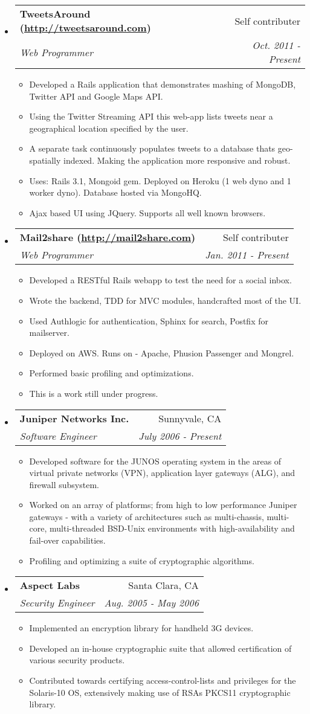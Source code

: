 \documentclass[letterpaper,11pt]{article}
\makeatletter
\newcommand{\resitem}[1]{\item #1 \vspace{-2pt}}
\newcommand{\resheading}[1]{{\large \parashade[.9]{sharpcorners}{\textbf{#1 \vphantom{p\^{E}}}}}}
\newcommand{\ressubheading}[4]{
\begin{tabular*}{6.5in}{l@{\extracolsep{\fill}}r}
		\textbf{#1} & #2 \\
		\textit{#3} & \textit{#4} \\
\end{tabular*}\vspace{-6pt}}
\makeatother
\begin{document}
\resheading{Work Experience}
\begin{itemize}

\item
	\ressubheading{TweetsAround (\url{http://tweetsaround.com})}{Self contributer}{Web Programmer}{Oct. 2011 - Present}
	\begin{itemize}
		\resitem{Developed a Rails application that demonstrates mashing of MongoDB, Twitter API and Google Maps API.}
		\resitem{Using the Twitter Streaming API this web-app lists tweets near a geographical location specified by the user.}
		\resitem{A separate task continuously populates tweets to a database thats geo-spatially indexed. 
		 		 Making the application more responsive and robust.}
		\resitem{Uses: Rails 3.1, Mongoid gem.  Deployed on Heroku (1 web dyno and 1 worker dyno). Database hosted via MongoHQ.}
		\resitem{Ajax based UI using JQuery. Supports all well known browsers.}
	\end{itemize}

\item
	\ressubheading{Mail2share (\url{http://mail2share.com})}{Self contributer}{Web Programmer}{Jan. 2011 - Present}
	\begin{itemize}
		\resitem{Developed a RESTful Rails webapp to test the need for a social inbox.}
		\resitem{Wrote the backend, TDD for MVC modules, handcrafted most of the UI.}
		\resitem{Used Authlogic for authentication, Sphinx for search, Postfix for mailserver.}
		\resitem{Deployed on AWS. Runs on - Apache, Phusion Passenger and Mongrel.}
		\resitem{Performed basic profiling and optimizations.}
		\resitem{This is a work still under progress.}
	\end{itemize}
		
\item
	\ressubheading{Juniper Networks Inc.}{Sunnyvale, CA}{Software Engineer}{July 2006 - Present}
	\begin{itemize}
		\resitem{Developed software for the JUNOS operating system in the areas of virtual 
		         private networks (VPN), application layer gateways (ALG), and firewall subsystem.}
		\resitem{Worked on an array of platforms; from high to low performance Juniper gateways - 
				 with a variety of architectures such as multi-chassis, multi-core, multi-threaded 
				 BSD-Unix environments with high-availability and fail-over capabilities.}
		\resitem{Profiling and optimizing a suite of cryptographic algorithms.}
	\end{itemize}

\item 
	\ressubheading{Aspect Labs}{Santa Clara, CA}{Security Engineer}{Aug. 2005 - May 2006}
	\begin{itemize}
		\resitem{Implemented an encryption library for handheld 3G devices.}
		\resitem{Developed an in-house cryptographic suite that allowed certification of various 
				 security products.}
		\resitem{Contributed towards certifying access-control-lists and privileges for the 
				 Solaris-10 OS, extensively making use of RSAs PKCS11 cryptographic library.}
	\end{itemize}


\end{itemize}
\end{document}

